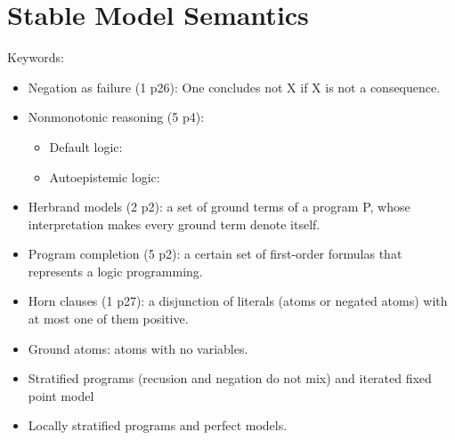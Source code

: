 \section{Stable Model Semantics}
Keywords: 
\begin{itemize}
    \item Negation as failure (1 p26): One concludes not X if X is not a consequence. 
    \item Nonmonotonic reasoning (5 p4): 
    \begin{itemize}
        \item Default logic:
        \item Autoepistemic logic:
    \end{itemize}
    \item Herbrand models (2 p2): a set of ground terms of a program P, whose interpretation 
    makes every ground term denote itself.
    \item Program completion (5 p2): a certain set of first-order formulas that represents a logic 
    programming.
    \item Horn clauses (1 p27): a disjunction of literals (atoms or negated atoms) with at most one of 
    them positive.
    \item Ground atoms: atoms with no variables.
    \item Stratified programs (recusion and negation do not mix) and iterated fixed point model 
    \item Locally stratified programs and perfect models.
\end{itemize}
